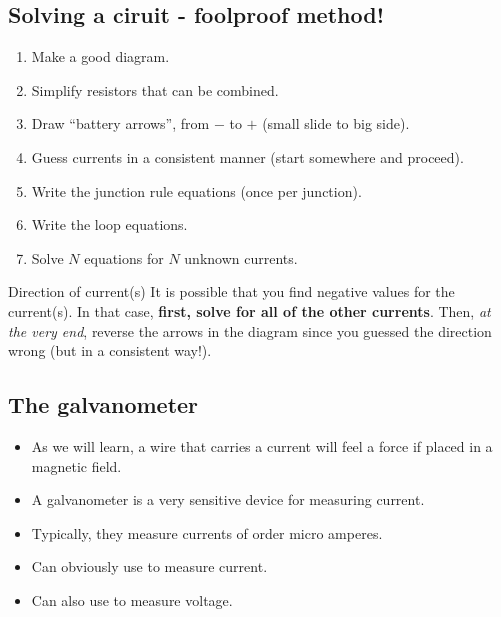 \documentclass[aspectratio=169,
hyperref={colorlinks,urlcolor=blue}
]{beamer}
\begin{document}
\subsection{Solving a ciruit - foolproof method!}
\label{subsec:solcingacircuitfoolproofmethod}
{
\begin{enumerate}
\item Make a good diagram.
\item Simplify resistors that can be combined.
\item Draw ``battery arrows'', from $-$ to $+$ (small slide to big side).
\item Guess currents in a consistent manner (start somewhere and proceed).
\item Write the junction rule equations (once per junction).
\item Write the loop equations.
\item Solve $N$ equations for $N$ unknown currents.
\end{enumerate}
}
{
\vspace{-1.75cm}
\vspace{-1cm}
\begin{exampleblock}{Direction of current(s)}
It is possible that you find negative values for the current(s). In that case, \textbf{first, solve for all of the other currents}. Then, \textit{at the very end}, reverse the arrows in the diagram since you guessed the direction wrong (but in a consistent way!).
\end{exampleblock}
}









\subsection{The galvanometer}
\label{subsec:thegalvanometer}
{
\begin{itemize}
\item As we will learn, a wire that carries a current will feel a force if placed in a magnetic field.
\item A galvanometer is a very sensitive device for measuring current.
\item Typically, they measure currents of order micro amperes.
\item Can obviously use to measure current.
\item Can also use to measure voltage.
\end{itemize}
}
{
}
\end{document}
